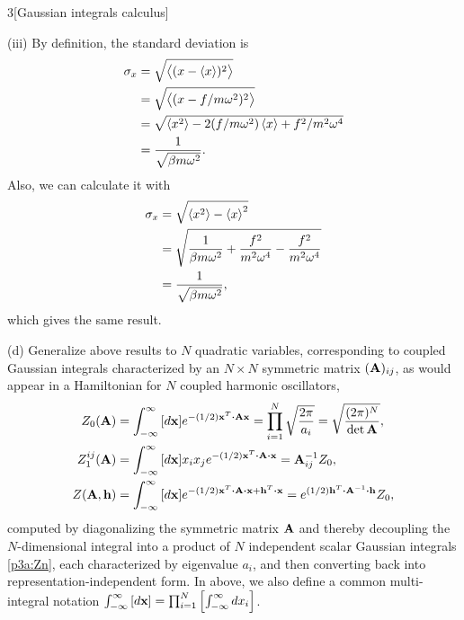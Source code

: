 \documentclass[12pt]{article}
\begin{document}
\begin{problem}{3}[Gaussian integrals calculus]
\begin{solution}
(iii) By definition, the standard deviation is
\begin{align}
    \sigma_x
    &=\sqrt{\expval{(x-\expval{x})^2}}\notag\\
    &=\sqrt{\expval{(x-f/m\omega^2)^2}}\notag\\
    &=\sqrt{\expval{x^2}-2(f/m\omega^2)\expval{x}+f^2/m^2\omega^4}\notag\\
    &=\frac1{\sqrt{\beta m\omega^2}}.
\end{align}
Also, we can calculate it with
\begin{align}
    \sigma_x
    &=\sqrt{\expval{x^2}-\expval{x}^2}\notag\\
    &=\sqrt{\frac1{\beta
    m\omega^2}+\frac{f^2}{m^2\omega^4}-\frac{f^2}{m^2\omega^4}}\notag\\
    &=\frac1{\sqrt{\beta m\omega^2}},
\end{align}
which gives the same result.
\end{solution}

(d) Generalize above results to $N$ quadratic variables, corresponding to
coupled Gaussian integrals characterized by an $N\times N$ symmetric matrix
$(\vb{A})_{ij}$, as would appear in a Hamiltonian for $N$ coupled harmonic
oscillators,
\begin{subequations}
    \begin{align}
        Z_0(\vb{A})&=\int_{-\infty}^\infty
        \qty[d\vb{x}]e^{-(1/2)\vb{x}^T\vdot\vb{A}\vb{x}}=\prod_{i=1}^N\sqrt{\frac{2\pi}{a_i}}=\sqrt{\frac{(2\pi)^N}{\det\vb{A}}},
        \\
        Z_1^{ij}(\vb{A})
                   &=\int_{-\infty}^\infty
                   \qty[d\vb{x}]x_ix_je^{-(1/2)\vb{x}^T\vdot\vb{A}\vdot\vb{x}}=\vb{A}_{ij}^{-1}Z_0,\\
                   Z(\vb{A},\vb{h})
                   &=\int_{-\infty}^\infty\qty[d\vb{x}]
                   e^{-(1/2)\vb{x}^T\vdot\vb{A}\vdot\vb{x}+\vb{h}^T\vdot\vb{x}}
                   =e^{(1/2)\vb{h}^T\vdot\vb{A}^{-1}\vdot\vb{h}}Z_0,
    \end{align} 
\end{subequations}
computed by diagonalizing the symmetric matrix $\vb{A}$ and thereby decoupling
the $N$-dimensional integral into a product of $N$ independent scalar Gaussian
integrals \eqref{p3a:Zn}, each characterized by eigenvalue $a_i$, and then
converting back into representation-independent form. In above, we also define a
common multi-integral notation
$\int_{-\infty}^\infty\qty[d\vb{x}]=\prod_{i=1}^N\qty[\int_{-\infty}^\infty
dx_i]$.


\end{problem}
\end{document}
